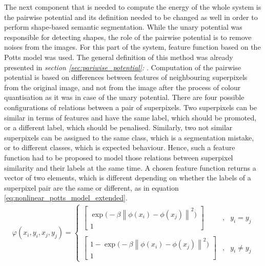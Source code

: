 The next component that is needed to compute the energy of the whole system is the pairwise potential and its definition needed to be changed as well in order to perform shape-based semantic segmentation. While the unary potential was responsible for detecting shapes, the role of the pairwise potential is to remove noises from the images. For this part of the system, feature function based on the Potts model was used. The general definition of this method was already presented in \textit{section \ref{sec:pariwise_potential}: }. Computation of the pairwise potential is based on differences between features of neighbouring superpixels from the original image, and not from the image after the process of colour quantisation as it was in case of the unary potential. There are four possible configurations of relations between a pair of superpixels. Two superpixels can be similar in terms of features and have the same label, which should be promoted, or a different label, which should be penalised. Similarly, two not similar superpixels can be assigned to the same class, which is a segmentation mistake, or to different classes, which is expected behaviour. Hence, such a feature function had to be proposed to model those relations between superpixel similarity and their labels at the same time. A chosen feature function returns a vector of two elements, which is different depending on whether the labels of a superpixel pair are the same or different, as in equation \ref{eq:nonlinear_potts_model_extended}.
\begin{align}
    \label{eq:nonlinear_potts_model_extended}
    \varphi(x_i,y_i,x_j,y_j) = \left\{\begin{matrix}
     \begin{bmatrix}
               \exp{\big(-\beta \left \| \phi(x_i) - \phi(x_j)\right \|^2\big)} \\
                1
            \end{bmatrix}  & , & y_i = y_j\\ 
    \\
    \begin{bmatrix}
               1 -\exp{\big(-\beta \left \| \phi(x_i) - \phi(x_j)\right \|^2\big)} \\
                1
            \end{bmatrix} & , & y_i \neq y_j
    \end{matrix}\right.
\end{align}

